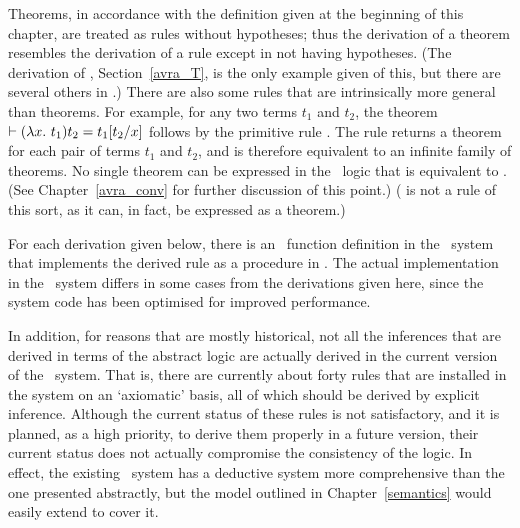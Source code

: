 Theorems, in accordance with the definition given
at the beginning of this chapter,
are treated as rules without hypotheses; thus the derivation
of a theorem resembles the derivation of a rule except in not having
hypotheses. (The derivation of ,
Section~\ref{avra_T}, is the only example given of this,
but there are several others in \HOL.)
There are also some rules that are intrinsically more general than theorems.
For example, for any two terms $t_1$ and $t_2$, the theorem
$\vdash(\lambda x.\ t_1)t_2 = t_1[t_2/x]$ follows by the primitive
rule . The rule 
returns a theorem for each pair of terms $t_1$ and $t_2$, and is
therefore equivalent to an infinite family of theorems. No single theorem
can be expressed in the \HOL\ logic that is equivalent to .
(See Chapter~\ref{avra_conv} for further discussion of this point.)
( is not a rule of this sort, as it can, in fact,
be expressed as a theorem.)

For each derivation given below, there is an \ML\ function definition in
the \HOL\ system that
implements the derived rule as a procedure in \ML. The actual 
implementation in the 
\HOL\ system differs in some cases
from the derivations given here, since the system code has 
been optimised for improved performance.

In addition, for reasons that are mostly historical, not all the
inferences that are derived in terms of the abstract logic are actually derived
in the current version of the \HOL\ system.
That is, there are
currently about forty rules that are installed in the system on an `axiomatic'
basis, all of which should be derived by explicit inference.
Although the current status of these rules is not satisfactory,
and it is planned, as a high priority,
to derive them properly in a future version, their current status
does not actually compromise the consistency of the logic.  In effect,
the existing \HOL\ system has a deductive system more comprehensive
than the one presented abstractly, but the model outlined in
Chapter~\ref{semantics} would easily extend to cover it.

